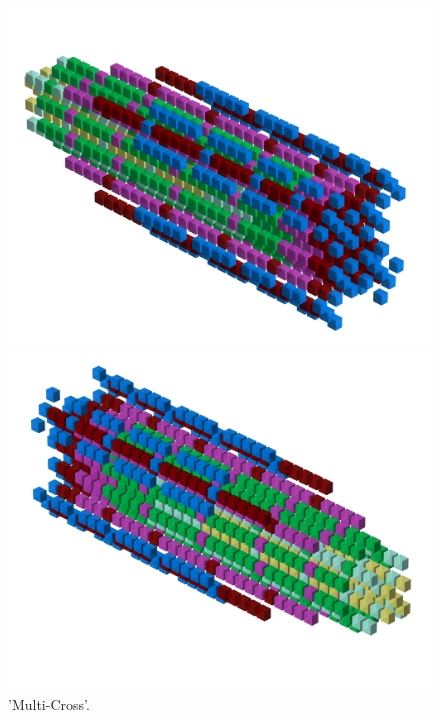 \begin{figure}[H]
    \centering
    \begin{adjustbox}{width=12cm,center}
      \includegraphics[width=12cm]{src/patterns/pattern6-45.png}%
    \end{adjustbox}
    \begin{adjustbox}{width=12cm,margin=0cm -4cm}
      \includegraphics[width=12cm]{src/patterns/pattern6-225.png}%
    \end{adjustbox}
\caption{'Multi-Cross'.}
\end{figure}
\clearpage

